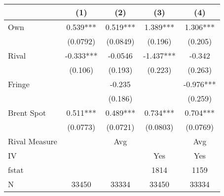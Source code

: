 {
\def\sym#1{\ifmmode^{#1}\else\(^{#1}\)\fi}
\begin{tabular}{l*{4}{c}}
\toprule
                &\multicolumn{1}{c}{(1)}   &\multicolumn{1}{c}{(2)}   &\multicolumn{1}{c}{(3)}   &\multicolumn{1}{c}{(4)}   \\
\midrule
Own             &    0.539***&    0.519***&    1.389***&    1.306***\\
                & (0.0792)   & (0.0849)   &  (0.196)   &  (0.205)   \\
\addlinespace
Rival           &   -0.333***&  -0.0546   &   -1.437***&   -0.342   \\
                &  (0.106)   &  (0.193)   &  (0.223)   &  (0.263)   \\
\addlinespace
Fringe          &            &   -0.235   &            &   -0.976***\\
                &            &  (0.186)   &            &  (0.259)   \\
\addlinespace
Brent Spot      &    0.511***&    0.489***&    0.734***&    0.704***\\
                & (0.0773)   & (0.0721)   & (0.0803)   & (0.0769)   \\
\midrule
Rival Measure   &            &      Avg   &            &      Avg   \\
IV              &            &            &      Yes   &      Yes   \\
fstat           &            &            &     1814   &     1159   \\
N               &    33450   &    33334   &    33450   &    33334   \\
\bottomrule
\end{tabular}
}
